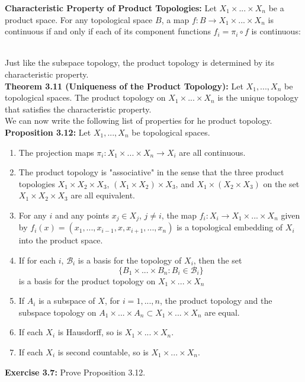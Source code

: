 \documentclass{article}
\begin{document}
  \textbf{Characteristic Property of Product Topologies:} Let $X_1\times...\times X_n$ be a product space. For any topological space $B$, a map $f:B\to X_1\times ...\times X_n$ is continuous if and only if each of its component functions $f_i=\pi_i\circ f$ is continuous:\\
  \\
  Just like the subspace topology, the product topology is determined by its characteristic property.\\
  \textbf{Theorem 3.11 (Uniqueness of the Product Topology):} Let $X_1,...,X_n$ be topological spaces. The product topology on $X_1\times...\times X_n$ is the unique topology that satisfies the characteristic property.\\

  We can now write the following list of properties for he product topology.\\
  \textbf{Proposition 3.12:} Let $X_1,...,X_n$ be topological spaces.

  \begin{enumerate}[label=(\alph*.)]
    \item The projection maps $\pi_i:X_1\times...\times X_n\to X_i$ are all continuous.
    \item The product topology is "associative" in the sense that the three product topologies $X_1\times X_2\times X_3$, $(X_1\times X_2) \times X_3$, and $X_1\times (X_2\times X_3)$ on the set $X_1\times X_2\times X_3$ are all equivalent.
    \item For any $i$ and any points $x_j\in X_j$, $j\neq i$, the map $f_i:X_i\to X_1\times ...\times X_n$ given by $f_i(x)=(x_1,...,x_{i-1},x,x_{i+1},...,x_n)$ is a topological embedding of $X_i$ into the product space.
    \item If for each $i$, $\mathcal{B}_i$ is a basis for the topology of $X_i$, then the set\begin{equation*}
        \{B_1\times ...\times B_n:B_i\in\mathcal{B}_i\}
    \end{equation*}
    is a basis for the product topology on $X_1\times...\times X_n$
    \item If $A_i$ is a subspace of $X$, for $i=1,...,n$, the product topology and the subspace topology on $A_1\times...\times A_n\subset X_1\times ...\times X_n$ are equal.
    \item If each $X_i$ is Hausdorff, so is $X_1\times ...\times X_n$.
    \item If each $X_i$ is second countable, so is $X_1\times ... \times X_n$.
  \end{enumerate}
  \textbf{Exercise 3.7:} Prove Proposition 3.12.
\end{document}
